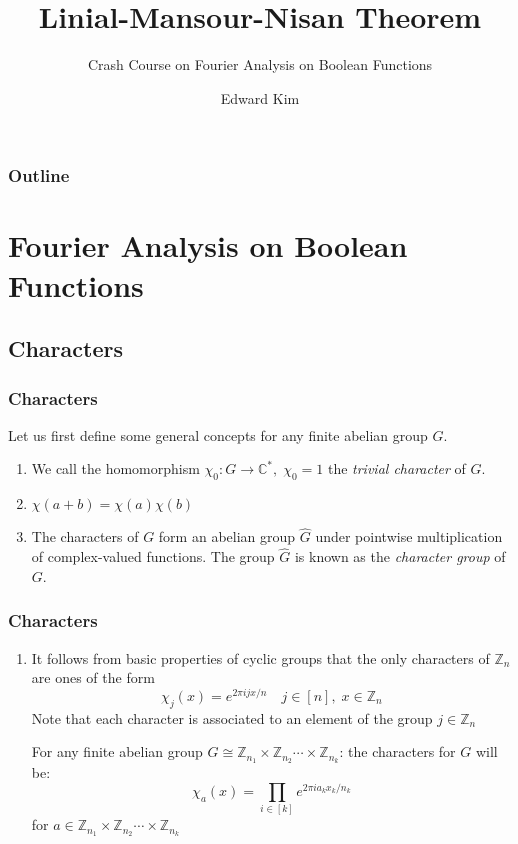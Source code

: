 \documentclass{beamer}
\title{Linial-Mansour-Nisan Theorem}
\subtitle{Crash Course on Fourier Analysis on Boolean Functions}
\author{Edward Kim}
\begin{document}
\begin{frame}
\titlepage
\end{frame}

\begin{frame}
\label{contents}
\frametitle{Outline}
\tableofcontents
\end{frame}

\section{Fourier Analysis on Boolean Functions}
\subsection{Characters}

\begin{frame}
\frametitle{Characters}
Let us first define some general concepts for any finite abelian group $G$.

\begin{enumerate}
\begin{definition}
  A group homomorphism from $\chi: G \rightarrow \mathbb{C}^*$ is called a \emph{character} of $G$ where $\mathbb{C}^* = \mathbb{C}/\{0\}$
\end{definition}

\item We call the homomorphism $\chi_0:G \rightarrow \mathbb{C}^*, \; \chi_0 = 1$ the \emph{trivial character} of $G$.
\item $\chi(a + b) = \chi(a)\chi(b)$
\item  The characters of $G$ form an abelian group $\hat{G}$ under pointwise multiplication of complex-valued functions. The group $\hat{G}$ is known as the \emph{character group} of $G$.
\end{enumerate}
\end{frame}

\begin{frame}
\frametitle{Characters}
  \begin{enumerate}
    \item It follows from basic properties of cyclic groups that the only characters of $\mathbb{Z}_n$ are ones of the form $$ \chi_j(x) = e^{ 2\pi i jx/n} \quad j \in [n], \; x \in \mathbb{Z}_n $$ Note that each character is associated to an element of the group $j \in \mathbb{Z}_n$
    \begin{theorem}
    For any finite abelian group $G \cong \mathbb{Z}_{n_1} \times \mathbb{Z}_{n_2} \cdots \times\mathbb{Z}_{n_k}$: the characters for $G$ will be:
    $$   \chi_a(x) = \prod_{i \in [k]} e^{2 \pi i a_k x_k/ n_k} $$
    for $a \in \mathbb{Z}_{n_1} \times \mathbb{Z}_{n_2} \cdots \times\mathbb{Z}_{n_k}$
    \end{theorem}
  \end{enumerate}
\end{frame}
\end{document}
